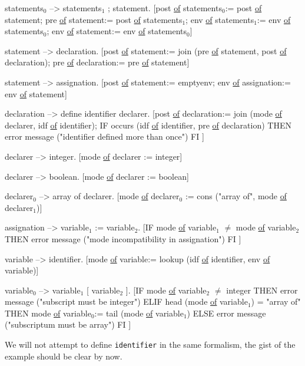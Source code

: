 \begin{elan}
statements$_0$ --> statements$_1$ ; statement.
   [post \underline{of} statements$_0$:= post \underline{of} statement;
    pre \underline{of} statement:= post \underline{of} statements$_1$;
    env \underline{of} statements$_1$:= env \underline{of} statements$_0$;
    env \underline{of} statement:= env \underline{of} statements$_0$]
\end{elan}
\begin{elan}
statement --> declaration.
   [post \underline{of} statement:=
         join (pre \underline{of} statement, post \underline{of} declaration);
    pre \underline{of} declaration:= pre \underline{of} statement]
\end{elan}
\begin{elan}
statement --> assignation.
   [post \underline{of} statement:= emptyenv;
    env \underline{of} assignation:= env \underline{of} statement]
\end{elan}
\begin{elan}
declaration --> define identifier declarer.
   [post \underline{of} declaration:=
        join (mode \underline{of} declarer, idf \underline{of} identifier);
    IF occurs (idf \underline{of} identifier, pre \underline{of} declaration)
    THEN error message ("identifier defined more than once")
    FI ]
\end{elan}
\begin{elan}
declarer --> integer.
   [mode \underline{of} declarer := integer]
\end{elan}
\begin{elan}
declarer --> boolean.
   [mode \underline{of} declarer := boolean]
\end{elan}
\begin{elan}
declarer$_0$ --> array of declarer.
   [mode \underline{of} declarer$_0$ := cons ("array of", mode \underline{of} declarer$_1$)]
\end{elan}
\begin{elan}
assignation --> variable$_1$ := variable$_2$.
   [IF mode \underline{of} variable$_1$ $\neq$ mode \underline{of} variable$_2$
    THEN error message ("mode incompatibility in assignation")
    FI ]
\end{elan}
\begin{elan}
variable --> identifier.
   [mode \underline{of} variable:= lookup (idf \underline{of} identifier, env \underline{of} variable)]
\end{elan}
\begin{elan}
variable$_0$ --> variable$_1$ [ variable$_2$ ].
   [IF mode \underline{of} variable$_2$ $\neq$ integer
    THEN error message ("subscript must be integer")
    ELIF head (mode \underline{of} variable$_1$) = "array of"
    THEN mode \underline{of} variable$_0$:= tail (mode \underline{of} variable$_1$)
    ELSE error message ("subscriptum must be array")
    FI ]
\end{elan}
We will not attempt to define {\tt identifier} in the same formalism,
the gist of the example should be clear by now.

